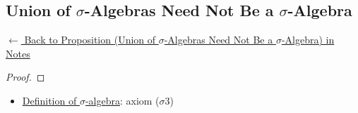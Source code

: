 
\subsection*{Union of $\sigma$-Algebras Need Not Be a $\sigma$-Algebra}
\label{prf:union-sigma-algebras-fails}

\begin{remark*}[Return]
\hyperref[prop:union-sigma-algebras-fails]{$\leftarrow$ Back to Proposition (Union of $\sigma$-Algebras Need Not Be a $\sigma$-Algebra) in Notes}
\end{remark*}

\begin{proof}
\end{proof}

\begin{remark*}

\end{remark*}

\begin{remark*}[Dependencies]
\begin{itemize}
  \item \hyperref[def:sigma-algebra]{Definition of $\sigma$-algebra}: axiom ($\sigma$3)
\end{itemize}

\end{remark*}
